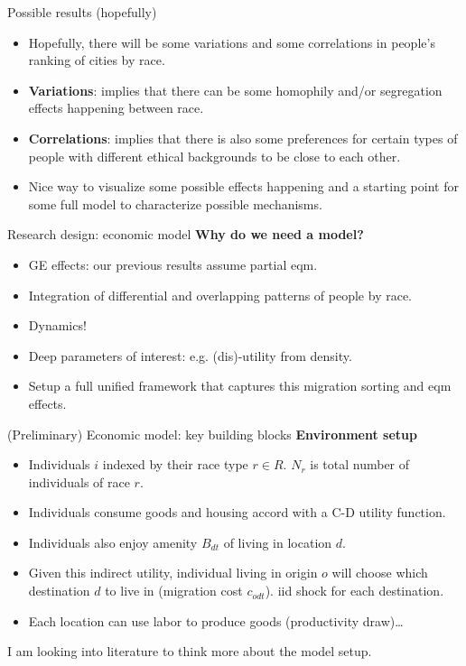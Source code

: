 \documentclass[aspectratio=169]{beamer}
\begin{document}
\begin{frame}{Possible results (hopefully)}
	\begin{itemize}
		\item Hopefully, there will be some variations and some correlations in people's ranking of cities by race.
		\item \textbf{Variations}: implies that there can be some homophily and/or segregation effects happening between race.
		\item \textbf{Correlations}: implies that there is also some preferences for certain types of people with different ethical backgrounds to be close to each other.
		\item Nice way to visualize some possible effects happening and a starting point for some full model to characterize possible mechanisms.
	\end{itemize}
\end{frame}

\begin{frame}{Research design: economic model}
	\textbf{Why do we need a model?}	
	\begin{itemize}
		\item GE effects: our previous results assume partial eqm.
		\item Integration of differential and overlapping patterns of people by race.
		\item Dynamics!
		\item Deep parameters of interest: e.g. (dis)-utility from density. 
		\item Setup a full unified framework that captures this migration sorting and eqm effects.
	\end{itemize}
\end{frame}

\begin{frame}{(Preliminary) Economic model: key building blocks}
	\textbf{Environment setup}	
	\begin{itemize}
		\item Individuals $i$ indexed by their race type $r \in R$. $N_r$ is total number of individuals of race $r$. 
		\item Individuals consume goods and housing accord with a C-D utility function.
		\item Individuals also enjoy amenity $B_{dt}$ of living in location $d$.
		\item Given this indirect utility, individual living in origin $o$ will choose which destination $d$ to live in (migration cost $c_{odt}$). iid shock for each destination.
		\item Each location can use labor to produce goods (productivity draw)\ldots
	\end{itemize}

	I am looking into literature to think more about the model setup.
\end{frame}
\end{document}
